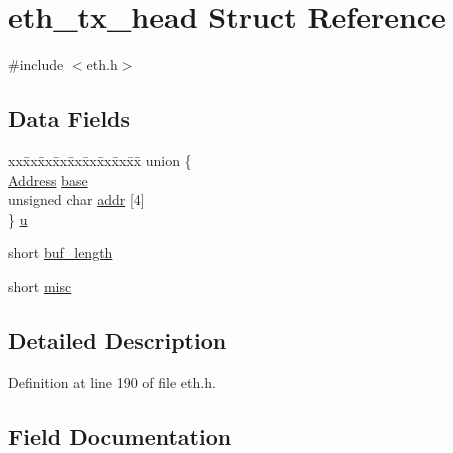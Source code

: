 \hypertarget{structeth__tx__head}{}\section{eth\+\_\+tx\+\_\+head Struct Reference}
\label{structeth__tx__head}


{\ttfamily \#include $<$eth.\+h$>$}

\subsection*{Data Fields}
\begin{DoxyCompactItemize}
\item 
\begin{tabbing}
xx\=xx\=xx\=xx\=xx\=xx\=xx\=xx\=xx\=\kill
union \{\\
\>\hyperlink{tap_8h_a40606a38de2ce007717541a358bab07b}{Address} \hyperlink{structeth__tx__head_ac2b0a066dca09bf3826dfaea2d1c5d02}{base}\\
\>unsigned char \hyperlink{structeth__tx__head_a9f5c6c0d6caad222593cc7c428567764}{addr} \mbox{[}4\mbox{]}\\
\} \hyperlink{structeth__tx__head_a1544798358cd2c759d7a720acbe1e54d}{u}\\

\end{tabbing}\item 
short \hyperlink{structeth__tx__head_a92d29d8c4362c4b8a391fb5de16bcfd5}{buf\+\_\+length}
\item 
short \hyperlink{structeth__tx__head_a9e51fa9fe6fdfe9b721010432087f889}{misc}
\end{DoxyCompactItemize}


\subsection{Detailed Description}


Definition at line 190 of file eth.\+h.



\subsection{Field Documentation}
\hypertarget{structeth__tx__head_a9f5c6c0d6caad222593cc7c428567764}{}\label{structeth__tx__head_a9f5c6c0d6caad222593cc7c428567764} 
